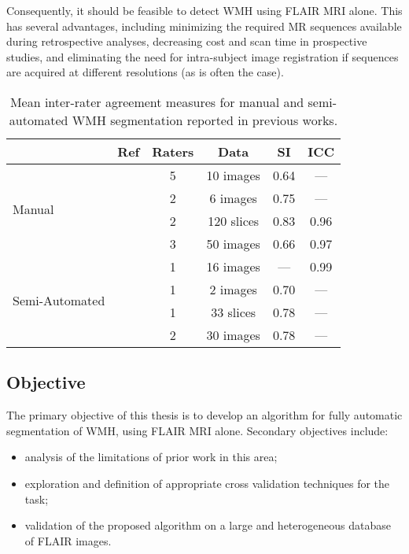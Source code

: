 Consequently, it should be feasible to detect WMH using FLAIR MRI alone.
This has several advantages, including minimizing the required MR sequences available during retrospective analyses, decreasing cost and scan time in prospective studies, and eliminating the need for intra-subject image registration if sequences are acquired at different resolutions (as is often the case).
\par
\begin{table}[h]
  \caption{Mean inter-rater agreement measures for manual and semi-automated WMH segmentation reported in previous works.}
  \centering
  \begin{tabular}{lccccc}
    \hline
                                    &         Ref          & Raters &    Data    &  SI  & ICC  \\ \hline
    \multirow{4}{*}{Manual}         & \cite{Harmouche2006} &   5    & 10 images  & 0.64 & ---  \\
                                    &  \cite{DeBoer2009b}  &   2    &  6 images  & 0.75 & ---  \\
                                    & \cite{Steenwijk2013} &   2    & 120 slices & 0.83 & 0.96 \\
                                    &   \cite{Egger2017}   &   3    & 50 images  & 0.66 & 0.97 \\ \hline
    \multirow{4}{*}{Semi-Automated} &   \cite{Payne2002}   &   1    & 16 images  & ---  & 0.99 \\
                                    &  \cite{Ghazel2006}   &   1    &  2 images  & 0.70 & ---  \\
                                    &  \cite{Kawata2010}   &   1    & 33 slices  & 0.78 & ---  \\
                                    &   \cite{Iorio2013}   &   2    & 30 images  & 0.78 & ---  \\ \hline
  \end{tabular}
  \label{tab:interrater-cite}
\end{table}
\subsection{Objective}
The primary objective of this thesis is to develop an algorithm for fully automatic segmentation of WMH, using FLAIR MRI alone.
Secondary objectives include:
\begin{itemize}
  \item analysis of the limitations of prior work in this area;
  \item exploration and definition of appropriate cross validation techniques for the task;
  \item validation of the proposed algorithm on a large and heterogeneous database of FLAIR images.
\end{itemize}
